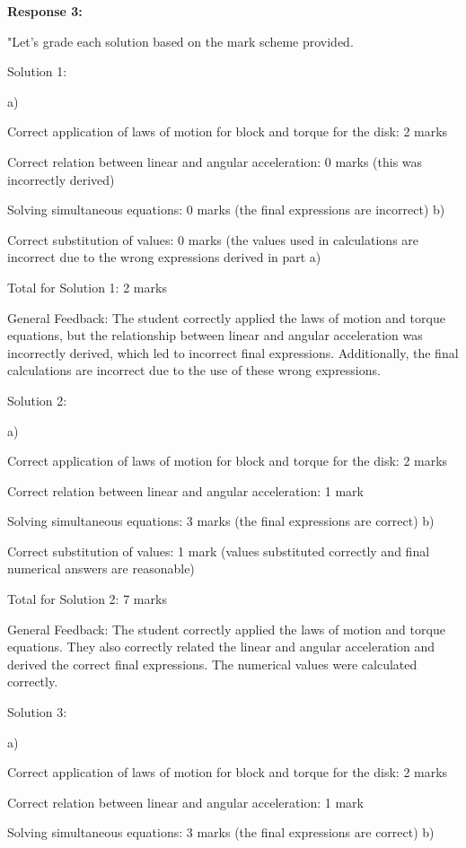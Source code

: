 \documentclass[a4paper,11pt]{article}
\begin{document}
\textbf{Response 3:}

"Let's grade each solution based on the mark scheme provided.

Solution 1:

a)

Correct application of laws of motion for block and torque for the disk: 2 marks

Correct relation between linear and angular acceleration: 0 marks (this was incorrectly derived)

Solving simultaneous equations: 0 marks (the final expressions are incorrect)
b)

Correct substitution of values: 0 marks (the values used in calculations are incorrect due to the wrong expressions derived in part a)

Total for Solution 1: 2 marks

General Feedback: The student correctly applied the laws of motion and torque equations, but the relationship between linear and angular acceleration was incorrectly derived, which led to incorrect final expressions. Additionally, the final calculations are incorrect due to the use of these wrong expressions.

Solution 2:

a)

Correct application of laws of motion for block and torque for the disk: 2 marks

Correct relation between linear and angular acceleration: 1 mark

Solving simultaneous equations: 3 marks (the final expressions are correct)
b)

Correct substitution of values: 1 mark (values substituted correctly and final numerical answers are reasonable)

Total for Solution 2: 7 marks

General Feedback: The student correctly applied the laws of motion and torque equations. They also correctly related the linear and angular acceleration and derived the correct final expressions. The numerical values were calculated correctly.

Solution 3:

a)

Correct application of laws of motion for block and torque for the disk: 2 marks

Correct relation between linear and angular acceleration: 1 mark

Solving simultaneous equations: 3 marks (the final expressions are correct)
b)
\end{document}
